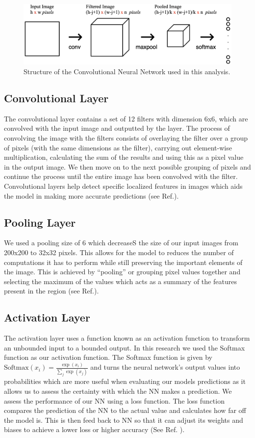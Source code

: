 \documentclass[conference]{IEEEtran}
\begin{document}
\begin{figure}[ht!]
  \centering
  \includegraphics[scale=0.2]{images/CNN_layers.png}
  \caption{Structure of the Convolutional Neural Network used in this analysis.}
  \label{fig:CNN_layers}

\end{figure}

\subsection{Convolutional Layer}
The convolutional layer contains a set of 12 filters with dimension 6x6,  which are convolved with the input image and outputted by the layer. The process of convolving the image with the filters consists of overlaying the filter over a group of pixels (with the same dimensions as the filter), carrying out element-wise multiplication, calculating the sum of the results and using this as a pixel value in the output image. We then move on to the next possible grouping of pixels and continue the process until the entire image has been convolved with the filter. Convolutional layers help detect specific localized features in images which aids the model in making more accurate predictions (see Ref.\cite{CNNPart1_VZ_2019}).
\subsection{Pooling Layer}
We used a pooling size of 6 which decreaseS the size of  our input images from 200x200 to 32x32 pixels. This allows for the model to reduces the number of computations it has to perform while still preserving the important elements of the image. This is achieved by “pooling” or grouping pixel values together and selecting the maximum of the values which acts as a summary of the features present in the region (see Ref.\cite{CNNPart1_VZ_2019}).
\subsection{Activation Layer}
The activation layer uses a function known as an activation function to transform an unbounded input to a bounded output. In this research we used the Softmax function as our activation function. The Softmax function is given by $\text{Softmax}(x_{i}) = \frac{\exp(x_i)}{\sum_j \exp(x_j)}$ and turns the neural network's output values into probabilities which are more useful when evaluating our models predictions as it allows us to assess the certainty with which the NN makes a prediction. We assess the performance of our NN using a loss function. The loss function compares the prediction of the NN to the actual value and calculates how far off the model is. This is then feed back to NN so that it can adjust its weights and biases to achieve a lower loss or higher accuracy (See Ref. \cite{Softmax}).
\end{document}
